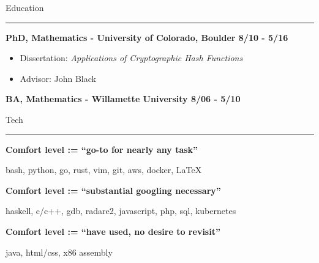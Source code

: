 \documentclass{letter}
\begin{document}
\vspc

\large{Education}
\vskip1mm
\hrule

\textbf{PhD, Mathematics - University of Colorado, Boulder \hfill 8/10 - 5/16}
\begin{itemize}
    \setlength\itemsep{-0.5em}
    \item Dissertation: \textit{Applications of Cryptographic Hash Functions}
    \item Advisor: John Black
\end{itemize}

\textbf{BA, Mathematics - Willamette University \hfill 8/06 - 5/10}

\vspc

\large{Tech}
\vskip1mm
\hrule

\textbf{Comfort level := ``go-to for nearly any task''}

bash, python, go, rust, vim, git, aws, docker, \LaTeX

\vspc

\textbf{Comfort level := ``substantial googling necessary''}

haskell, c/c++, gdb, radare2, javascript, php, sql, kubernetes

\vspc

\textbf{Comfort level := ``have used, no desire to revisit''}

java, html/css, x86 assembly
\end{document}
